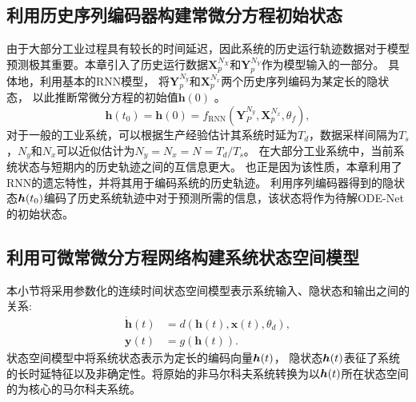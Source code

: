 \subsection{利用历史序列编码器构建常微分方程初始状态}
由于大部分工业过程具有较长的时间延迟，因此系统的历史运行轨迹数据对于模型预测极其重要。本章引入了历史运行数据$\boldsymbol {X}_{p}^{N_{X}}$和$\boldsymbol {Y}_{p}^{N_{Y}}$作为模型输入的一部分。
具体地，利用基本的RNN模型，
将$\boldsymbol{Y}_p^{N_y}$和$\boldsymbol {X}_p^{N_x}$两个历史序列编码为某定长的隐状态，
以此推断常微分方程的初始值$\boldsymbol{h}(0)$ 。
\begin{equation}
\label{equ:rnn_encoder}
 \boldsymbol{h}(t_0) = \boldsymbol{h}(0) = f_{\text{RNN}}(\boldsymbol{Y}_P^{N_y},\boldsymbol X_p^{N_x},\theta _f),
\end{equation}
对于一般的工业系统，可以根据生产经验估计其系统时延为$T_d$，数据采样间隔为$T_s$，$N_y$和$N_x$可以近似估计为$N_y = N_x = N = T_d/T_s$。
在大部分工业系统中，当前系统状态与短期内的历史轨迹之间的互信息更大。
也正是因为该性质，本章利用了RNN的遗忘特性，并将其用于编码系统的历史轨迹。
利用序列编码器得到的隐状态$\boldsymbol h(t_0)$编码了历史系统轨迹中对于预测所需的信息，该状态将作为待解ODE-Net的初始状态。

\subsection{利用可微常微分方程网络构建系统状态空间模型}
\label{sec:ODE-Net}
本小节将采用参数化的连续时间状态空间模型表示系统输入、隐状态和输出之间的关系:
\begin{equation}
    \begin{aligned}
     \dot{\boldsymbol h}(t)&=d(\boldsymbol{h}(t), \boldsymbol{x}(t), \theta _d),\\
\boldsymbol{y}(t)&=g(\boldsymbol{h}(t)).
    \end{aligned}
    \label{equ:ct_state_space}
\end{equation}
状态空间模型中将系统状态表示为定长的编码向量$\boldsymbol h(t)$，
隐状态$\boldsymbol h(t)$表征了系统的长时延特征以及非确定性。将原始的非马尔科夫系统转换为以$\boldsymbol h(t)$所在状态空间的为核心的马尔科夫系统。

